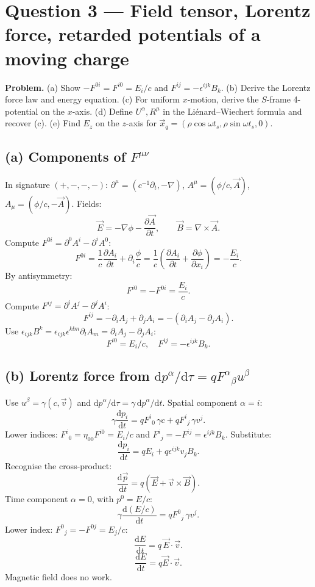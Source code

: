 \documentclass[11pt]{article}
\newcommand{\de}{\mathrm{d}}
\newcommand{\pd}[2]{\frac{\partial #1}{\partial #2}}
\begin{document}
\section*{Question 3 --- Field tensor, Lorentz force, retarded potentials of a moving charge}

\textbf{Problem.} (a) Show $-F^{0i}=F^{i0}=E_{i}/c$ and $F^{ij}=-\epsilon^{ijk}B_{k}$. (b) Derive the Lorentz force law and energy equation. (c) For uniform $x$-motion, derive the $S$-frame 4-potential on the $x$-axis. (d) Define $U^{\alpha},R^{\mu}$ in the Li{\'e}nard--Wiechert formula and recover (c). (e) Find $E_{z}$ on the $z$-axis for $\vec x_{q}=(\rho\cos\omega t_{s},\rho\sin\omega t_{s},0)$.

\subsection*{(a) Components of $F^{\mu\nu}$}

In signature $(+,-,-,-)$: $\partial^{\mu}=(c^{-1}\partial_{t},-\nabla)$, $A^{\mu}=(\phi/c,\vec A)$, $A_{\mu}=(\phi/c,-\vec A)$. Fields:
\[ \vec E=-\nabla\phi-\pd{\vec A}{t},\qquad \vec B=\nabla\times\vec A. \]
Compute $F^{0i}=\partial^{0}A^{i}-\partial^{i}A^{0}$:
\[ F^{0i}=\frac{1}{c}\pd{A_{i}}{t}+\partial_{i}\frac{\phi}{c}=\frac{1}{c}\!\left(\pd{A_{i}}{t}+\pd{\phi}{x_{i}}\right)=-\frac{E_{i}}{c}. \]
By antisymmetry:
\[ F^{i0}=-F^{0i}=\frac{E_{i}}{c}. \]
Compute $F^{ij}=\partial^{i}A^{j}-\partial^{j}A^{i}$:
\[ F^{ij}=-\partial_{i}A_{j}+\partial_{j}A_{i}=-(\partial_{i}A_{j}-\partial_{j}A_{i}). \]
Use $\epsilon_{ijk}B^{k}=\epsilon_{ijk}\epsilon^{klm}\partial_{l}A_{m}=\partial_{i}A_{j}-\partial_{j}A_{i}$:
\begin{equation}
\boxed{\;F^{i0}=E_{i}/c,\quad F^{ij}=-\epsilon^{ijk}B_{k}.\;}
\end{equation}

\subsection*{(b) Lorentz force from $\de p^{\alpha}/\de\tau=qF^{\alpha}{}_{\beta}u^{\beta}$}

Use $u^{\beta}=\gamma(c,\vec v)$ and $\de p^{\alpha}/\de\tau=\gamma\,\de p^{\alpha}/\de t$. Spatial component $\alpha=i$:
\[ \gamma\frac{\de p_{i}}{\de t}=qF^{i}{}_{0}\,\gamma c+qF^{i}{}_{j}\,\gamma v^{j}. \]
Lower indices: $F^{i}{}_{0}=\eta_{00}F^{i0}=E_{i}/c$ and $F^{i}{}_{j}=-F^{ij}=\epsilon^{ijk}B_{k}$. Substitute:
\[ \frac{\de p_{i}}{\de t}=qE_{i}+q\epsilon^{ijk}v_{j}B_{k}. \]
Recognise the cross-product:
\begin{equation}
\boxed{\;\frac{\de\vec p}{\de t}=q(\vec E+\vec v\times\vec B).\;}
\end{equation}
Time component $\alpha=0$, with $p^{0}=E/c$:
\[ \gamma\frac{\de(E/c)}{\de t}=qF^{0}{}_{j}\,\gamma v^{j}. \]
Lower index: $F^{0}{}_{j}=-F^{0j}=E_{j}/c$:
\[ \frac{\de E}{\de t}=q\,\vec E\!\cdot\!\vec v. \]
\begin{equation}
\boxed{\;\frac{\de E}{\de t}=q\vec E\!\cdot\!\vec v.\;}
\end{equation}
Magnetic field does no work.
\end{document}
